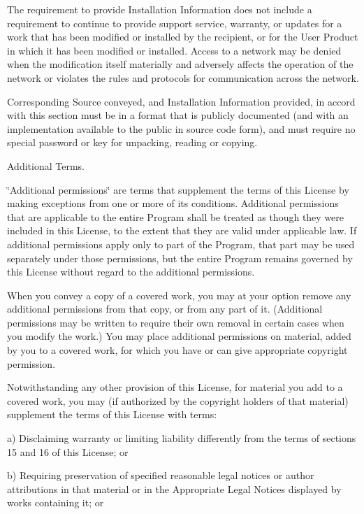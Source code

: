 The requirement to provide Installation Information does not include a requirement to continue to provide support service, warranty, or updates for a work that has been modified or installed by the recipient, or for the User Product in which it has been modified or installed. Access to a network may be denied when the modification itself materially and adversely affects the operation of the network or violates the rules and protocols for communication across the network.

Corresponding Source conveyed, and Installation Information provided, in accord with this section must be in a format that is publicly documented (and with an implementation available to the public in source code form), and must require no special password or key for unpacking, reading or copying.


\begin{DoxyEnumerate}
\item Additional Terms.
\end{DoxyEnumerate}

\char`\"{}\-Additional permissions\char`\"{} are terms that supplement the terms of this License by making exceptions from one or more of its conditions. Additional permissions that are applicable to the entire Program shall be treated as though they were included in this License, to the extent that they are valid under applicable law. If additional permissions apply only to part of the Program, that part may be used separately under those permissions, but the entire Program remains governed by this License without regard to the additional permissions.

When you convey a copy of a covered work, you may at your option remove any additional permissions from that copy, or from any part of it. (Additional permissions may be written to require their own removal in certain cases when you modify the work.) You may place additional permissions on material, added by you to a covered work, for which you have or can give appropriate copyright permission.

Notwithstanding any other provision of this License, for material you add to a covered work, you may (if authorized by the copyright holders of that material) supplement the terms of this License with terms\-:

a) Disclaiming warranty or limiting liability differently from the terms of sections 15 and 16 of this License; or

b) Requiring preservation of specified reasonable legal notices or author attributions in that material or in the Appropriate Legal Notices displayed by works containing it; or

